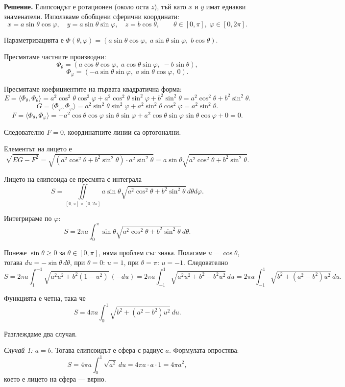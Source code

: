 \documentclass[10pt]{article}
\begin{document}
\textbf{Решение.} 
Елипсоидът е ротационен (около оста $z$), тъй като $x$ и $y$ имат еднакви знаменатели. Използваме обобщени сферични координати:
\[
x = a\sin\theta\cos\varphi,\quad y = a\sin\theta\sin\varphi,\quad z = b\cos\theta,\qquad \theta\in[0,\pi],\; \varphi\in[0,2\pi].
\]

Параметризацията е $\Phi(\theta,\varphi) = (a\sin\theta\cos\varphi,\; a\sin\theta\sin\varphi,\; b\cos\theta)$.

Пресмятаме частните производни:
\[
\Phi_\theta = \left(a\cos\theta\cos\varphi,\; a\cos\theta\sin\varphi,\; -b\sin\theta\right),
\]
\[
\Phi_\varphi = \left(-a\sin\theta\sin\varphi,\; a\sin\theta\cos\varphi,\; 0\right).
\]

Пресмятаме коефициентите на първата квадратична форма:
\[
E = \langle \Phi_\theta, \Phi_\theta \rangle = a^2\cos^2\theta\cos^2\varphi + a^2\cos^2\theta\sin^2\varphi + b^2\sin^2\theta = a^2\cos^2\theta + b^2\sin^2\theta.
\]
\[
G = \langle \Phi_\varphi, \Phi_\varphi \rangle = a^2\sin^2\theta\sin^2\varphi + a^2\sin^2\theta\cos^2\varphi = a^2\sin^2\theta.
\]
\[
F = \langle \Phi_\theta, \Phi_\varphi \rangle = -a^2\cos\theta\cos\varphi\sin\theta\sin\varphi + a^2\cos\theta\sin\varphi\sin\theta\cos\varphi + 0 = 0.
\]

Следователно $F = 0$, координатните линии са ортогонални.

Елементът на лицето е
\[
\sqrt{EG - F^2} = \sqrt{(a^2\cos^2\theta + b^2\sin^2\theta) \cdot a^2\sin^2\theta} = a\sin\theta \sqrt{a^2\cos^2\theta + b^2\sin^2\theta}.
\]

Лицето на елипсоида се пресмята с интеграла
\[
S = \iint\limits_{[0,\pi]\times[0,2\pi]} a\sin\theta \sqrt{a^2\cos^2\theta + b^2\sin^2\theta} \, d\theta d\varphi.
\]

Интегрираме по $\varphi$:
\[
S = 2\pi a \int_0^\pi \sin\theta \sqrt{a^2\cos^2\theta + b^2\sin^2\theta} \, d\theta.
\]

Понеже $\sin\theta \ge 0$ за $\theta\in[0,\pi]$, няма проблем със знака. Полагаме $u = \cos\theta$, тогава $du = -\sin\theta\,d\theta$, при $\theta=0$: $u=1$, при $\theta=\pi$: $u=-1$. Следователно
\[
S = 2\pi a \int_{1}^{-1} \sqrt{a^2 u^2 + b^2(1-u^2)} \, (-du) = 2\pi a \int_{-1}^{1} \sqrt{a^2 u^2 + b^2 - b^2 u^2} \, du = 2\pi a \int_{-1}^{1} \sqrt{b^2 + (a^2-b^2)u^2} \, du.
\]

Функцията е четна, така че
\[
S = 4\pi a \int_0^1 \sqrt{b^2 + (a^2-b^2)u^2} \, du.
\]

Разглеждаме два случая.

\textit{Случай 1: $a = b$.} 
Тогава елипсоидът е сфера с радиус $a$. Формулата опростява:
\[
S = 4\pi a \int_0^1 \sqrt{a^2} \, du = 4\pi a \cdot a \cdot 1 = 4\pi a^2,
\]
което е лицето на сфера — вярно.
\end{document}
